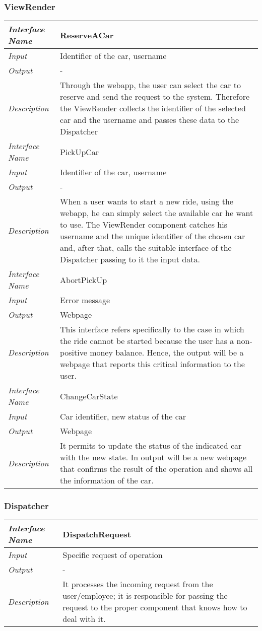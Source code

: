 \documentclass[11pt,a4paper]{report}
\begin{document}
\subsubsection{ViewRender}
\begin{tabularx}{\textwidth}{|>{\em}l|X|}
	\hline
	Interface Name& ReserveACar\\
	\hline
	Input & Identifier of the car, username\\
	\hline
	Output & -\\
	\hline
	Description &Through the webapp, the user can select the car to reserve and send the request to the system. Therefore the ViewRender collects the identifier of the selected car and the username and passes these data to the Dispatcher\\
	\hline\hline
	Interface Name& PickUpCar\\
	\hline
	Input & Identifier of the car, username\\
	\hline
	Output & -\\
	\hline
	Description &When a user wants to start a new ride, using the webapp, he can simply select the available car he want to use. The ViewRender component catches his username and the unique identifier of the chosen car and, after that, calls the suitable interface of the Dispatcher passing to it the input data.\\
	\hline\hline
	Interface Name& AbortPickUp\\
	\hline
	Input & Error message\\
	\hline
	Output & Webpage\\
	\hline
	Description &This interface refers specifically to the case in which the ride cannot be started because the user has a non-positive money balance. Hence, the output will be a webpage that reports this critical information to the user.\\
	\hline\hline
	Interface Name& ChangeCarState\\
	\hline
	Input & Car identifier, new status of the car\\
	\hline
	Output & Webpage\\
	\hline
	Description &It permits to update the status of the indicated car with the new state. In output will be a new webpage that confirms the result of the operation and shows all the information of the car.\\
	\hline
\end{tabularx}
\subsubsection{Dispatcher}
\begin{tabularx}{\textwidth}{|>{\em}l|X|}
	\hline
	Interface Name& DispatchRequest\\
	\hline
	Input & Specific request of operation\\
	\hline
	Output & -\\
	\hline
	Description &It processes the incoming request from the user/employee; it is responsible for passing the request to the proper component that knows how to deal with it.\\
	\hline
\end{tabularx}
\end{document}
